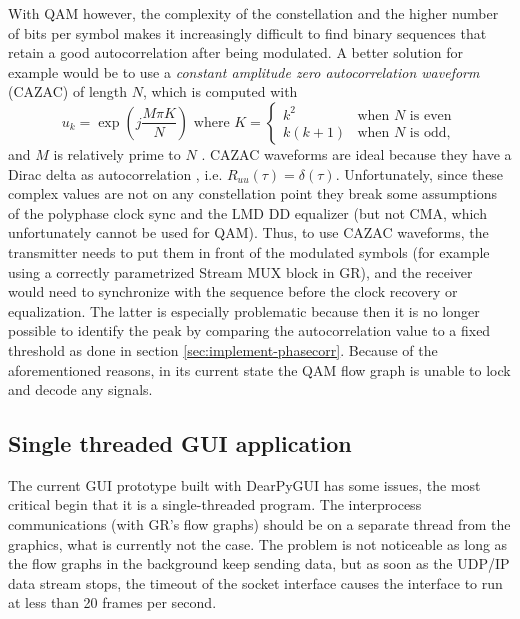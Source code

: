 With QAM however, the complexity of the constellation and the higher number of bits per symbol makes it increasingly difficult to find binary sequences that retain a good autocorrelation after being modulated. A better solution for example would be to use a \emph{constant amplitude zero autocorrelation waveform} (CAZAC) of length \(N\), which is computed with
\begin{equation}
	u_k = \exp\left(j\frac{M\pi K}{N}\right) \text{ where }
	K = \begin{cases}
		k^2 & \text{when } N \text{ is even} \\
		k(k+1) & \text{when } N \text{ is odd},
	\end{cases}
\end{equation}
and \(M\) is relatively prime to \(N\) \cite{Chu1972}. CAZAC waveforms are ideal because they have a Dirac delta as autocorrelation \cite{Chu1972}, i.e. \(R_{uu}(\tau) = \delta(\tau)\). Unfortunately, since these complex values are not on any constellation point they break some assumptions of the polyphase clock sync and the LMD DD equalizer (but not CMA, which unfortunately cannot be used for QAM). Thus, to use CAZAC waveforms, the transmitter needs to put them in front of the modulated symbols (for example using a correctly parametrized Stream MUX block in GR), and the receiver would need to synchronize with the sequence before the clock recovery or equalization. The latter is especially problematic because then it is no longer possible to identify the peak by comparing the autocorrelation value to a fixed threshold as done in section \ref{sec:implement-phasecorr}. Because of the aforementioned reasons, in its current state the QAM flow graph is unable to lock and decode any signals.

\subsection{Single threaded GUI application} \label{sec:gui-issue-single-threaded}

The current GUI prototype built with DearPyGUI has some issues, the most critical begin that it is a single-threaded program. The interprocess communications (with GR's flow graphs) should be on a separate thread from the graphics, what is currently not the case. The problem is not noticeable as long as the flow graphs in the background keep sending data, but as soon as the UDP/IP data stream stops, the timeout of the socket interface causes the interface to run at less than 20 frames per second.


